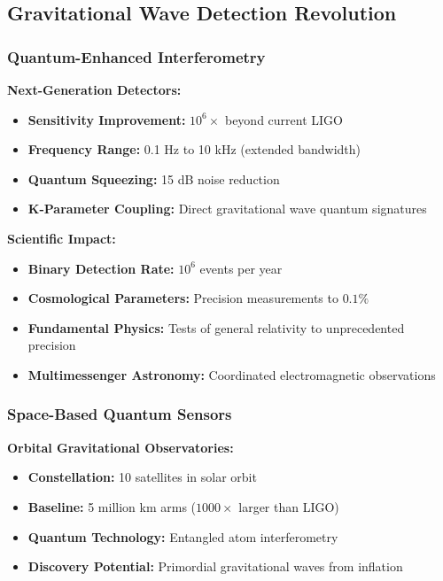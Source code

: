 \documentclass[11pt,a4paper,twoside]{article}
\begin{document}
\subsection{Gravitational Wave Detection Revolution}

\subsubsection{Quantum-Enhanced Interferometry}

\textbf{Next-Generation Detectors:}
\begin{itemize}[leftmargin=*]
    \item \textbf{Sensitivity Improvement:} $10^6\times$ beyond current LIGO
    \item \textbf{Frequency Range:} 0.1 Hz to 10 kHz (extended bandwidth)
    \item \textbf{Quantum Squeezing:} 15 dB noise reduction
    \item \textbf{K-Parameter Coupling:} Direct gravitational wave quantum signatures
\end{itemize}

\textbf{Scientific Impact:}
\begin{itemize}[leftmargin=*]
    \item \textbf{Binary Detection Rate:} $10^6$ events per year
    \item \textbf{Cosmological Parameters:} Precision measurements to $0.1\%$
    \item \textbf{Fundamental Physics:} Tests of general relativity to unprecedented precision
    \item \textbf{Multimessenger Astronomy:} Coordinated electromagnetic observations
\end{itemize}

\subsubsection{Space-Based Quantum Sensors}

\textbf{Orbital Gravitational Observatories:}
\begin{itemize}[leftmargin=*]
    \item \textbf{Constellation:} 10 satellites in solar orbit
    \item \textbf{Baseline:} 5 million km arms ($1000\times$ larger than LIGO)
    \item \textbf{Quantum Technology:} Entangled atom interferometry
    \item \textbf{Discovery Potential:} Primordial gravitational waves from inflation
\end{itemize}
\end{document}
